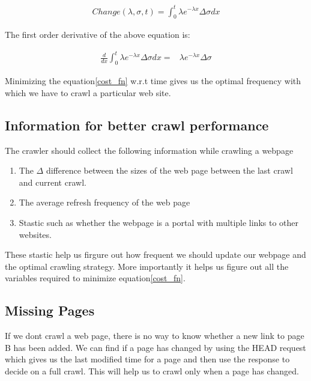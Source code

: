 \documentclass{article}
\begin{document}
\begin{align}
  \label{change_eq}
  Change(\lambda, \sigma, t) = \int_{0}^{t} \lambda e^{-\lambda x}\Delta\sigma dx
\end{align}

The first order derivative of the above equation is:

\begin{align}
  \label{cost_fn}
  \frac{d}{dx} \int_{0}^{t} \lambda e^{-\lambda x} \Delta \sigma dx =& \lambda e^{-\lambda x}\Delta\sigma
\end{align}

Minimizing the equation\eqref{cost_fn} w.r.t time gives us the optimal frequency with which we have to crawl a particular web site.

\subsection{Information for better crawl performance}
The crawler should collect the following information while crawling a webpage
\begin{enumerate}
  \item The $\Delta $ difference between the sizes of the web page between the last crawl and current crawl.
  \item The average refresh frequency of the web page
  \item Stastic such as whether the webpage is a portal with multiple links to other websites.
\end{enumerate}
These stastic help us firgure out how frequent we should update our webpage and the optimal crawling strategy.  More importantly it helps us figure out all the variables required to minimize equation\eqref{cost_fn}.

\subsection{Missing Pages}
If we dont crawl a web page, there is no way to know whether a new link to page B has been added.  We can find if a page has changed by using the HEAD request which gives us the last modified time for a page and then use the response to decide on a full crawl.  This will help us to crawl only when a page has changed.
\end{document}
